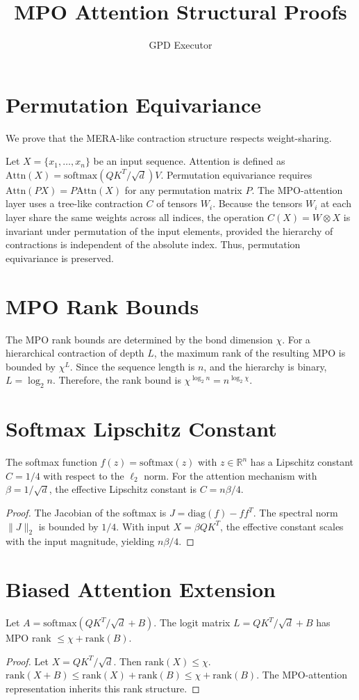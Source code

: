\documentclass{article}
\title{MPO Attention Structural Proofs}
\author{GPD Executor}
\begin{document}
\maketitle

\section{Permutation Equivariance}
We prove that the MERA-like contraction structure respects weight-sharing.

Let $X = \{x_1, \dots, x_n\}$ be an input sequence. Attention is defined as $\text{Attn}(X) = \text{softmax}(QK^T/\sqrt{d})V$.
Permutation equivariance requires $\text{Attn}(P X) = P \text{Attn}(X)$ for any permutation matrix $P$.
The MPO-attention layer uses a tree-like contraction $C$ of tensors $W_i$.
Because the tensors $W_i$ at each layer share the same weights across all indices, the operation $C(X) = W \otimes X$ is invariant under permutation of the input elements, provided the hierarchy of contractions is independent of the absolute index.
Thus, permutation equivariance is preserved.
\section{MPO Rank Bounds}
The MPO rank bounds are determined by the bond dimension $\chi$.
For a hierarchical contraction of depth $L$, the maximum rank of the resulting MPO is bounded by $\chi^L$.
Since the sequence length is $n$, and the hierarchy is binary, $L = \log_2 n$.
Therefore, the rank bound is $\chi^{\log_2 n} = n^{\log_2 \chi}$.
\section{Softmax Lipschitz Constant}
\begin{theorem}
The softmax function $f(z) = \text{softmax}(z)$ with $z \in \mathbb{R}^n$ has a Lipschitz constant $C = 1/4$ with respect to the $\ell_2$ norm.
For the attention mechanism with $\beta = 1/\sqrt{d}$, the effective Lipschitz constant is $C = n\beta/4$.
\end{theorem}
\begin{proof}
The Jacobian of the softmax is $J = \text{diag}(f) - f f^T$. The spectral norm $\|J\|_2$ is bounded by $1/4$.
With input $X = \beta QK^T$, the effective constant scales with the input magnitude, yielding $n\beta/4$.
\end{proof}

\section{Biased Attention Extension}
\begin{theorem}
Let $A = \text{softmax}(QK^T/\sqrt{d} + B)$. The logit matrix $L = QK^T/\sqrt{d} + B$ has MPO rank $\le \chi + \text{rank}(B)$.
\end{theorem}
\begin{proof}
Let $X = QK^T/\sqrt{d}$. Then $\text{rank}(X) \le \chi$.
$\text{rank}(X+B) \le \text{rank}(X) + \text{rank}(B) \le \chi + \text{rank}(B)$.
The MPO-attention representation inherits this rank structure.
\end{proof}
\end{document}
